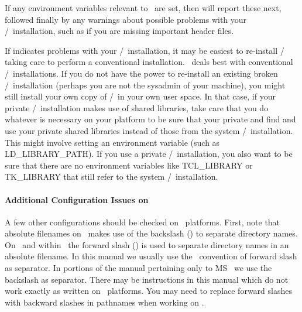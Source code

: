 If any environment variables relevant to \OOMMF\ are set, then
 will report these next, followed finally by any
warnings about possible problems with your \Tcl/\Tk\ installation, such
as if you are missing important header files.

If  indicates problems with your \Tcl/\Tk\
installation,
it may be easiest to re-install \Tcl/\Tk\, taking care to perform a
conventional installation.  \OOMMF\ deals best with conventional
\Tcl/\Tk\ installations.  If you do not have the power to re-install
an existing broken \Tcl/\Tk\ installation (perhaps you are not
the sysadmin of your machine), you might still install your own
copy of \Tcl/\Tk\ in your own user space.  In that case, if your
private \Tcl/\Tk\ installation makes use of shared libraries,
take care that you do whatever is necessary on your platform to
be sure that your private  and  
find and use your private
shared libraries instead of those from the system \Tcl/\Tk\ installation.
This might involve setting an environment variable (such as 
LD\_LIBRARY\_PATH).
If you use a private \Tcl/\Tk\ installation, you also want to be sure
that there are no environment variables like 
TCL\_LIBRARY
or TK\_LIBRARY
that still refer to the system \Tcl/\Tk\ installation.

\paragraph{Additional Configuration Issues on \Windows}

A few other configurations should be checked on \Windows\ platforms.
\index{platform!Windows!file~path~separator|(}
First, note that absolute filenames on \Windows\ makes use of the
backslash (\bs) to separate directory names.  On \Unix\ and
within \Tcl\ the forward slash (\fs) is used to separate directory
names in an absolute filename.  In this manual we usually use the
\Tcl\ convention of forward slash as separator.  In portions of the
manual pertaining only to MS \Windows\ we use the backslash as
separator.  There may be instructions in this manual which do not
work exactly as written on \Windows\ platforms.  You may need to
replace forward slashes with backward slashes in pathnames when
working on \Windows.

